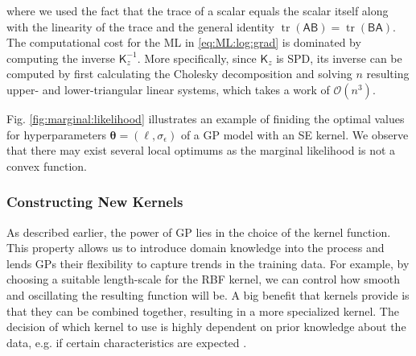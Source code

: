\documentclass[10pt]{article}
\theoremstyle{definition}
\DeclareMathOperator{\tr}{tr}
\begin{document}
where we used the fact that the trace of a scalar equals the scalar itself along with the linearity of the trace and the general identity $\tr(\mathsf{A}\mathsf{B})=\tr(\mathsf{B}\mathsf{A})$. The computational cost for the ML in \cref{eq:ML:log:grad} is dominated by computing the inverse $\mathsf{K}_z^{-1}$. More specifically, since $\mathsf{K}_z$ is SPD, its inverse can be computed by first calculating the Cholesky decomposition and solving $n$ resulting upper- and lower-triangular linear systems, which takes a work of $\mathcal{O}(n^3)$.

Fig. \ref{fig:marginal:likelihood} illustrates an example of finiding the optimal values for hyperparameters $\boldsymbol{\theta}=(\ell, \sigma_{\epsilon})$ of a GP model with an SE kernel. We observe that there may exist several local optimums as the marginal likelihood is not a convex function.

\subsubsection{Constructing New Kernels}
As described earlier, the power of GP lies in the choice of the kernel function. This property allows us to introduce domain knowledge into the process and lends GPs their flexibility to capture trends in the training data. For example, by choosing a suitable length-scale for the RBF kernel, we can control how smooth and oscillating the resulting function will be. A big benefit that kernels provide is that they can be combined together, resulting in a more specialized kernel. The decision of which kernel to use is highly dependent on prior knowledge about the data, e.g. if certain characteristics are expected \cite{Gortler2019}.
\end{document}
